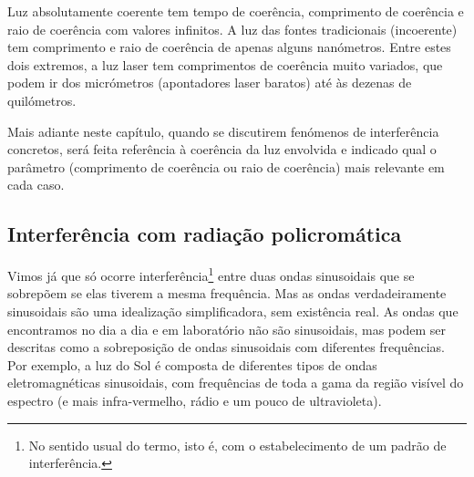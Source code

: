 Luz absolutamente coerente tem tempo de coerência, comprimento de coerência e
raio de coerência com valores infinitos. A luz das fontes tradicionais
(incoerente) tem comprimento e raio de coerência de apenas alguns nanómetros.
Entre estes dois extremos, a luz laser tem comprimentos de coerência muito
variados, que podem ir dos micrómetros (apontadores laser baratos) até às
dezenas de quilómetros.

Mais adiante neste capítulo, quando se discutirem fenómenos de interferência
concretos, será feita referência à coerência da luz envolvida e indicado qual o
parâmetro (comprimento de coerência ou raio de coerência) mais relevante em cada
caso.

\subsection{Interferência com radiação policromática}
Vimos já que só ocorre interferência\footnote{No sentido usual do termo, isto é,
com o estabelecimento de um padrão de interferência.} entre duas ondas
sinusoidais que se sobrepõem se elas tiverem a mesma frequência. Mas as ondas
verdadeiramente sinusoidais são uma idealização simplificadora, sem existência
real.  As ondas que encontramos no dia a dia e em laboratório não são
sinusoidais, mas podem ser descritas como a sobreposição de ondas sinusoidais
com diferentes frequências. Por exemplo, a luz do Sol é composta de diferentes
tipos de ondas eletromagnéticas sinusoidais, com frequências de toda a gama da
região visível do espectro (e mais infra-vermelho, rádio e um pouco de ultravioleta).


